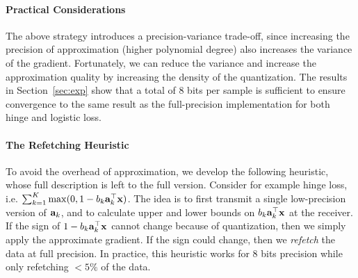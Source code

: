\paragraph{Practical Considerations} The above strategy introduces a precision-variance trade-off, since increasing the precision of approximation (higher polynomial degree) also increases the variance of the gradient. 
Fortunately, we can reduce the variance and increase the approximation quality by increasing the density of the quantization. 
The results in Section~\ref{sec:exp} show that a total of $8$ bits per sample is sufficient to ensure convergence to the same result as the full-precision 
implementation for both hinge and logistic loss. 


\paragraph*{The Refetching Heuristic}
To avoid the overhead of approximation, we develop the following heuristic, whose full description is left to the full version. 
Consider for example hinge loss, i.e.  $\sum_{k=1}^K \max(0, 1 - b_k {\bf a}_k^\top {\bf x})$. 
The idea is to 
first transmit a single low-precision version of ${\bf a}_k$, and to  
calculate upper and lower bounds on $b_k {\bf a}_k^\top {\bf x}$ at the receiver.
If the sign of $1-b_k {\bf a}_k^\top {\bf x}$ cannot change because of quantization, then we simply apply the approximate gradient. 
If the sign could change, then we {\em refetch} the data at full precision.
In practice, this heuristic works for 
8 bits precision while only refetching $<5\%$
of the data.


